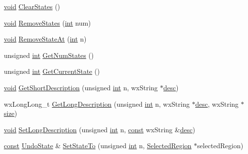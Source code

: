 \begin{DoxyCompactItemize}
\item 
\hyperlink{sound_8c_ae35f5844602719cf66324f4de2a658b3}{void} \hyperlink{class_undo_manager_a8fe2f757958a6a6e662b5435ef207f7b}{Clear\+States} ()
\item 
\hyperlink{sound_8c_ae35f5844602719cf66324f4de2a658b3}{void} \hyperlink{class_undo_manager_a131ea59f2a2cc81eab8b89e11209d894}{Remove\+States} (\hyperlink{xmltok_8h_a5a0d4a5641ce434f1d23533f2b2e6653}{int} num)
\item 
\hyperlink{sound_8c_ae35f5844602719cf66324f4de2a658b3}{void} \hyperlink{class_undo_manager_a475beecd49994e0ab5e6e1360f0f51b5}{Remove\+State\+At} (\hyperlink{xmltok_8h_a5a0d4a5641ce434f1d23533f2b2e6653}{int} n)
\item 
unsigned \hyperlink{xmltok_8h_a5a0d4a5641ce434f1d23533f2b2e6653}{int} \hyperlink{class_undo_manager_a3890341f4250bc1c2f69726b4e084f6d}{Get\+Num\+States} ()
\item 
unsigned \hyperlink{xmltok_8h_a5a0d4a5641ce434f1d23533f2b2e6653}{int} \hyperlink{class_undo_manager_ad501e8247b763abd4916c8cf1e7340fb}{Get\+Current\+State} ()
\item 
\hyperlink{sound_8c_ae35f5844602719cf66324f4de2a658b3}{void} \hyperlink{class_undo_manager_a65fb9c0eede3fa55b76d5139b8676413}{Get\+Short\+Description} (unsigned \hyperlink{xmltok_8h_a5a0d4a5641ce434f1d23533f2b2e6653}{int} n, wx\+String $\ast$\hyperlink{_export_p_c_m_8cpp_a717c8108dd6ce1ecc369d9bac2f471f2}{desc})
\item 
wx\+Long\+Long\+\_\+t \hyperlink{class_undo_manager_a4773321c037c0fd8baf168d593573815}{Get\+Long\+Description} (unsigned \hyperlink{xmltok_8h_a5a0d4a5641ce434f1d23533f2b2e6653}{int} n, wx\+String $\ast$\hyperlink{_export_p_c_m_8cpp_a717c8108dd6ce1ecc369d9bac2f471f2}{desc}, wx\+String $\ast$\hyperlink{group__lavu__mem_ga854352f53b148adc24983a58a1866d66}{size})
\item 
\hyperlink{sound_8c_ae35f5844602719cf66324f4de2a658b3}{void} \hyperlink{class_undo_manager_a2e12889f70857d1464eb95800d3e6bc8}{Set\+Long\+Description} (unsigned \hyperlink{xmltok_8h_a5a0d4a5641ce434f1d23533f2b2e6653}{int} n, \hyperlink{getopt1_8c_a2c212835823e3c54a8ab6d95c652660e}{const} wx\+String \&\hyperlink{_export_p_c_m_8cpp_a717c8108dd6ce1ecc369d9bac2f471f2}{desc})
\item 
\hyperlink{getopt1_8c_a2c212835823e3c54a8ab6d95c652660e}{const} \hyperlink{struct_undo_state}{Undo\+State} \& \hyperlink{class_undo_manager_a230eb598e5fcbf3bc0706b8c4ead5f36}{Set\+State\+To} (unsigned \hyperlink{xmltok_8h_a5a0d4a5641ce434f1d23533f2b2e6653}{int} n, \hyperlink{class_selected_region}{Selected\+Region} $\ast$selected\+Region)

\end{DoxyCompactItemize}
